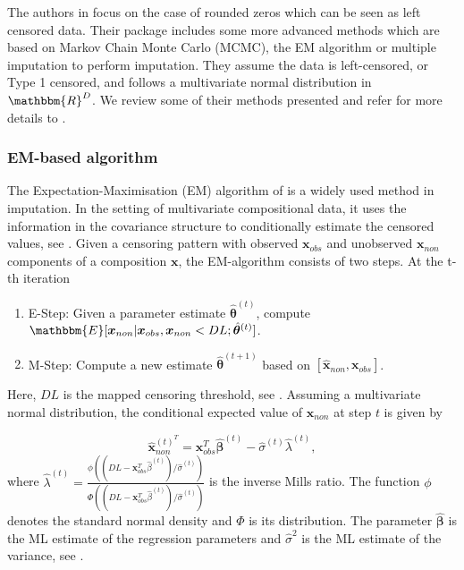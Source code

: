 The authors in \textcite{Palarea-Albaladejo:2015} focus on the case of rounded zeros which can be seen as left censored data. Their package includes some more advanced methods which are based on Markov Chain Monte Carlo (MCMC), the EM algorithm or multiple imputation to perform imputation. They assume the data is left-censored, or Type 1 censored, and follows a multivariate normal distribution in $\mathbbm{R}^D$. We review some of their methods presented and refer for more details to \textcite{Palarea-Albaladejo:2015}.

\subsubsection{EM-based algorithm}
\label{sec:EM Algorithm}

The Expectation-Maximisation (EM) algorithm of \textcite{Dempster:1977} is a widely used method in imputation. In the setting of multivariate compositional data, it uses the information in the covariance structure to conditionally estimate the censored values, see \textcite{Palarea-Albaladejo:2015}. Given a censoring pattern with observed $\bm{x}_{obs}$ and unobserved $\bm{x}_{non}$ components of a composition $\bm{x}$, the EM-algorithm consists of two steps. At the t-th iteration

\begin{enumerate}
	\item E-Step: Given a parameter estimate $\hat{\bm{\theta}}^{(t)}$, compute $\mathbbm{E}[\bm{x}_{non}|\bm{x}_{obs},\bm{x}_{non} < DL; \hat{\bm{\theta}}^{(t)}]$.
	\item M-Step: Compute a new estimate $\hat{\bm{\theta}}^{(t+1)}$ based on $[\hat{\bm{x}}_{non},\bm{x}_{obs}]$.
\end{enumerate}

Here, $DL$ is the mapped censoring threshold, see \textcite{Palarea-Albaladejo:2015}. Assuming a multivariate normal distribution, the conditional expected value of $\bm{x}_{non}$ at step $t$ is given by

\begin{equation}
\hat{\bm{x}}_{non}^{(t)^T} = \bm{x}_{obs}^T\hat{\bm{\beta}}^{(t)} - \hat{\sigma}^{(t)}\hat{\lambda}^{(t)},
\label{eq:E-step}
\end{equation}
%
where $\hat{\lambda}^{(t)}=\frac{\phi((DL-\bm{x}_{obs}^T\hat{\beta}^{(t)})/\hat{\sigma}^{(t)})}{\Phi((DL-\bm{x}_{obs}^T\hat{\beta}^{(t)})/\hat{\sigma}^{(t)})}$ is the inverse Mills ratio. The function $\phi$ denotes the standard normal density and $\Phi$ is its distribution. The parameter $\hat{\bm{\beta}}$ is the ML estimate of the regression parameters and $\hat{\sigma}^2$ is the ML estimate of the variance, see \textcite{Palarea-Albaladejo:2015}. %

